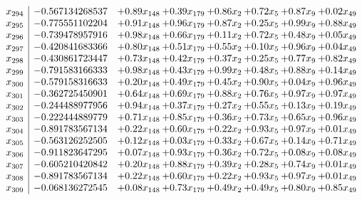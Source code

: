 \documentclass[8pt]{article}
\begin{document}
\[\begin{array}{c| c c@{\hskip 2pt} c@{\hskip 2pt} c@{\hskip 2pt} c@{\hskip 2pt} c@{\hskip 2pt} c@{\hskip 2pt} }
 x_{294}   &  -0.567134268537 & +  0.89 x_{148} & +  0.39 x_{179} & +  0.86 x_{2} & +  0.72 x_{5} & +  0.87 x_{9} & +  0.02 x_{49}\\
 x_{295}   &  -0.775551102204 & +  0.91 x_{148} & +  0.96 x_{179} & +  0.87 x_{2} & +  0.25 x_{5} & +  0.99 x_{9} & +  0.88 x_{49}\\
 x_{296}   &  -0.739478957916 & +  0.98 x_{148} & +  0.66 x_{179} & +  0.11 x_{2} & +  0.72 x_{5} & +  0.48 x_{9} & +  0.05 x_{49}\\
 x_{297}   &  -0.420841683366 & +  0.80 x_{148} & +  0.51 x_{179} & +  0.55 x_{2} & +  0.10 x_{5} & +  0.96 x_{9} & +  0.04 x_{49}\\
 x_{298}   &  -0.430861723447 & +  0.73 x_{148} & +  0.42 x_{179} & +  0.37 x_{2} & +  0.25 x_{5} & +  0.77 x_{9} & +  0.82 x_{49}\\
 x_{299}   &  -0.791583166333 & +  0.98 x_{148} & +  0.43 x_{179} & +  0.99 x_{2} & +  0.48 x_{5} & +  0.88 x_{9} & +  0.14 x_{49}\\
 x_{300}   &  -0.579158316633 & +  0.20 x_{148} & +  0.49 x_{179} & +  0.45 x_{2} & +  0.90 x_{5} & +  0.04 x_{9} & +  0.96 x_{49}\\
 x_{301}   &  -0.362725450901 & +  0.64 x_{148} & +  0.69 x_{179} & +  0.88 x_{2} & +  0.76 x_{5} & +  0.97 x_{9} & +  0.97 x_{49}\\
 x_{302}   &  -0.244488977956 & +  0.94 x_{148} & +  0.37 x_{179} & +  0.27 x_{2} & +  0.55 x_{5} & +  0.13 x_{9} & +  0.19 x_{49}\\
 x_{303}   &  -0.222444889779 & +  0.71 x_{148} & +  0.85 x_{179} & +  0.36 x_{2} & +  0.73 x_{5} & +  0.65 x_{9} & +  0.96 x_{49}\\
 x_{304}   &  -0.891783567134 & +  0.22 x_{148} & +  0.60 x_{179} & +  0.22 x_{2} & +  0.93 x_{5} & +  0.97 x_{9} & +  0.01 x_{49}\\
 x_{305}   &  -0.563126252505 & +  0.12 x_{148} & +  0.03 x_{179} & +  0.33 x_{2} & +  0.67 x_{5} & +  0.14 x_{9} & +  0.71 x_{49}\\
 x_{306}   &  -0.911823647295 & +  0.07 x_{148} & +  0.93 x_{179} & +  0.36 x_{2} & +  0.72 x_{5} & +  0.08 x_{9} & +  0.08 x_{49}\\
 x_{307}   &  -0.605210420842 & +  0.20 x_{148} & +  0.88 x_{179} & +  0.39 x_{2} & +  0.28 x_{5} & +  0.74 x_{9} & +  0.01 x_{49}\\
 x_{308}   &  -0.891783567134 & +  0.22 x_{148} & +  0.60 x_{179} & +  0.22 x_{2} & +  0.93 x_{5} & +  0.97 x_{9} & +  0.01 x_{49}\\
 x_{309}   &  -0.068136272545 & +  0.08 x_{148} & +  0.73 x_{179} & +  0.49 x_{2} & +  0.49 x_{5} & +  0.80 x_{9} & +  0.85 x_{49}\\

\end{array}\]
\end{document}
